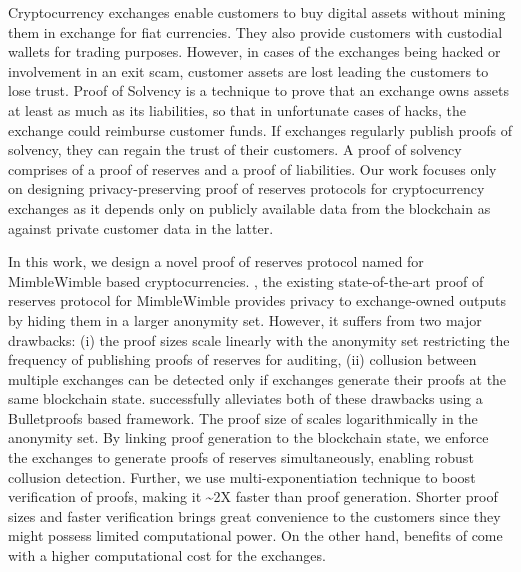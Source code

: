 \begin{Abstract}

Cryptocurrency exchanges enable customers to buy digital assets without mining them in exchange for fiat currencies.
They also provide customers with custodial wallets for trading purposes. 
However, in cases of the exchanges being hacked or involvement in an exit scam, customer assets are lost leading the customers to lose trust.
Proof of Solvency is a technique to prove that an exchange owns assets at least as much as its liabilities, so that in unfortunate cases of hacks, the exchange could reimburse customer funds.
If exchanges regularly publish proofs of solvency, they can regain the trust of their customers.
A proof of solvency comprises of a proof of reserves and a proof of liabilities.
Our work focuses only on designing privacy-preserving proof of reserves protocols for cryptocurrency exchanges as it depends only on publicly available data from the blockchain as against private customer data in the latter.

In this work, we design a novel proof of reserves protocol named \RB for MimbleWimble based cryptocurrencies.
\R \cite{Dutta2019b}, the existing state-of-the-art proof of reserves protocol for MimbleWimble provides privacy to exchange-owned outputs by hiding them in a larger anonymity set.
However, it suffers from two major drawbacks:
(i) the \R proof sizes scale linearly with the anonymity set restricting the frequency of publishing proofs of reserves for auditing,
(ii) collusion between multiple exchanges can be detected only if exchanges generate their proofs at the same blockchain state.
\RB successfully alleviates both of these drawbacks using a Bulletproofs \cite{Bunz2018} based framework.
The proof size of \RB scales logarithmically in the anonymity set.
By linking \RB proof generation to the blockchain state, we enforce the exchanges to generate proofs of reserves simultaneously, enabling robust collusion detection.
Further, we use multi-exponentiation technique to boost verification of \RB proofs, making it \textasciitilde2X faster than proof generation.
Shorter proof sizes and faster verification brings great convenience to the customers since they might possess limited computational power.
On the other hand, benefits of \RB come with a higher computational cost for the exchanges.    


\end{Abstract}
